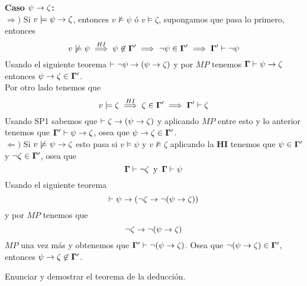 \documentclass[leqno, 12pt, twoside,letterpaper]{book}
\begin{document}
\begin{solucion}
\begin{dem}
\noindent \textbf{Caso $\psi \rightarrow \zeta$:} \\
\noindent $\Rightarrow)$ Si $v \models \psi \rightarrow \zeta$, entonces $v \not\models \psi$ ó $v \models \zeta$, supongamos que pasa lo primero, entonces
\[v \not\models \psi \overset{HI}{\implies} \psi \not\in\bm{\Gamma}' \implies \lnot\psi \in \bm{\Gamma}' \implies \bm{\Gamma}' \vdash \lnot\psi \]
Usando el siguiente teorema $\vdash \lnot\psi \rightarrow (\psi \rightarrow \zeta)$ y por $MP$ tenemos $\bm{\Gamma} \vdash \psi \rightarrow \zeta$ entonces $\psi \rightarrow \zeta \in \bm{\Gamma}'$. \\
Por otro lado tenemos que
	\[ v \models \zeta \overset{HI}{\implies} \zeta \in \bm{\Gamma}' \implies \bm{\Gamma}' \vdash \zeta \]
Usando SP1 sabemos que $\vdash \zeta \rightarrow (\psi \rightarrow \zeta)$ y aplicando $MP$ entre esto y lo anterior tenemos que $\bm{\Gamma}' \vdash \psi \rightarrow \zeta$, osea que $\psi \rightarrow \zeta \in \bm{\Gamma}'$.\\

\noindent $\Leftarrow)$ Si $v \not\models \psi \rightarrow \zeta$ esto pasa si $v \models \psi$ y $v \not\models \zeta$ aplicando la \textbf{HI} tenemos que $\psi \in \bm{\Gamma}'$ y $\lnot\zeta \in \bm{\Gamma}'$, osea que
\[\bm{\Gamma} \vdash \lnot\zeta \mbox{\, y \,} \bm{\Gamma} \vdash \psi\]
Usando el siguiente teorema
\[ \vdash \psi \rightarrow (\lnot \zeta \rightarrow \lnot(\psi \rightarrow \zeta))\]
y por $MP$ tenemos que
\[ \lnot\zeta \rightarrow \lnot(\psi \rightarrow \zeta)\]
$MP$ una vez más y obtenemos que $\bm{\Gamma}' \vdash \lnot(\psi \rightarrow \zeta)$. Osea que $\lnot(\psi \rightarrow \zeta) \in \bm{\Gamma}'$, entonces $\psi \rightarrow \zeta \not\in \bm{\Gamma}'$.
\end{dem}
\end{solucion}


\begin{ej}{2}
    Enunciar y demostrar el teorema de la deducción.
\end{ej}
\end{document}
